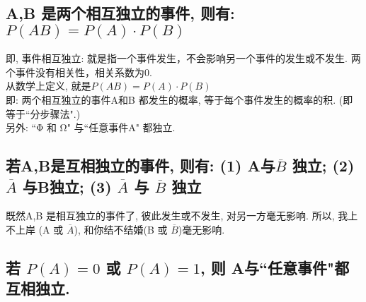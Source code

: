 \documentclass[UTF8]{ctexart}
\begin{document}
\subsection{A,B 是两个相互独立的事件, 则有: $P(AB)= P(A) \cdot P(B)$}

	即, 事件相互独立: 就是指一个事件发生，不会影响另一个事件的发生或不发生. 两个事件没有相关性，相关系数为0. \\
	从数学上定义, 就是$ P(AB)=P(A) \cdot P(B)$ \\
	即: 两个相互独立的事件A和B 都发生的概率, 等于每个事件发生的概率的积. (即等于``分步骤法".) \\
	
	另外:  ``Φ 和 Ω" 与``任意事件A" 都独立.
	
	
	

\subsection{若A,B是互相独立的事件, 则有: (1) A与$ \overline{B}$ 独立; (2) $ \overline{A}$ 与B独立; (3) $ \overline{A}$ 与 $ \overline{B}$ 独立}
	
	既然A,B 是相互独立的事件了, 彼此发生或不发生, 对另一方毫无影响. 所以, 我上不上岸 (A 或 $\overline{A}$), 和你结不结婚(B 或 $\overline{B}$)毫无影响. 
	
	
	
\subsection{若 $P(A)=0$ 或 $P(A)=1$, 则 A与``任意事件"都互相独立.}	

	
	







	
	
	
\end{document}
